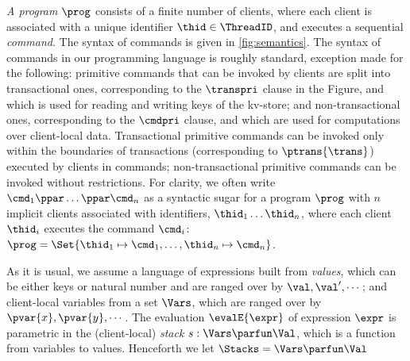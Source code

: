 \emph{A program} \( \prog \) consists of a finite number of clients, where each client is associated with a unique identifier \( \thid \in \ThreadID \), and executes a sequential \emph{command}. The syntax of commands is given in \cref{fig:semantics}. 
The syntax of commands in our programming language is roughly standard, exception made for the following: 
primitive commands that can be invoked by clients are split into transactional ones, corresponding to the $\transpri$ clause in the Figure, and which is used for reading 
and writing keys of the kv-store; and non-transactional ones, corresponding to the $\cmdpri$ clause, and which are used for computations over client-local data. 
Transactional primitive commands can be invoked only within the boundaries of transactions (corresponding to $\ptrans{\trans}$) executed by clients in commands;
non-transactional primitive commands can be invoked without restrictions.
For clarity, we often write \( \cmd_{1}\ppar \dots \ppar \cmd_{n}\) as a syntactic sugar for a program \( \prog \) with $n$ implicit clients associated with identifiers, $\thid_1 \dots \thid_n$, where each client $\thid_i$ executes the command $\cmd_i$:  \( \prog = \Set{\thid_{1} \mapsto \cmd_{1}, \dots, \thid_{n} \mapsto \cmd_{n}  }\).

As it is usual, we assume a language of expressions 
built from \emph{values}, which can be either keys or natural number and are ranged over by $\val, \val', \cdots$; 
and client-local variables from a set $\Vars$, which are ranged over by $\pvar{x}, \pvar{y}, \cdots$. The evaluation $\evalE{\expr}$ of  expression 
$\expr$  is parametric in the (client-local) \emph{stack} $s: \Vars \parfun \Val$, which is a function from variables to values. 
Henceforth we let $\Stacks = \Vars \parfun \Val$

